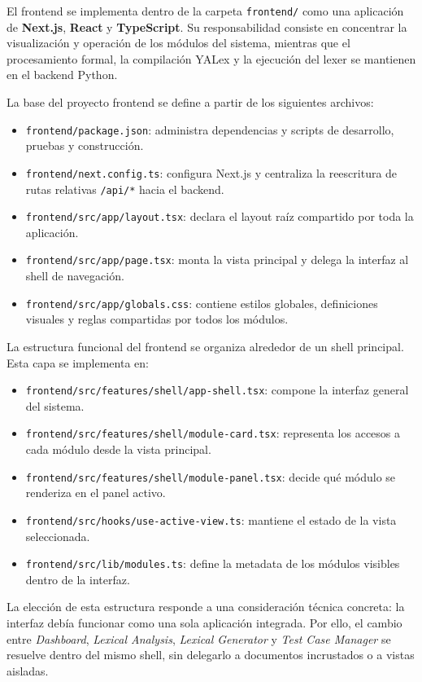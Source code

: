 \documentclass[12pt,a4paper]{article}
\begin{document}
El frontend se implementa dentro de la carpeta \texttt{frontend/} como una aplicación de \textbf{Next.js}, \textbf{React} y \textbf{TypeScript}. Su responsabilidad consiste en concentrar la visualización y operación de los módulos del sistema, mientras que el procesamiento formal, la compilación YALex y la ejecución del lexer se mantienen en el backend Python.

La base del proyecto frontend se define a partir de los siguientes archivos:

\begin{itemize}[leftmargin=2em]
  \item \texttt{frontend/package.json}: administra dependencias y scripts de desarrollo, pruebas y construcción.
  \item \texttt{frontend/next.config.ts}: configura Next.js y centraliza la reescritura de rutas relativas \texttt{/api/*} hacia el backend.
  \item \texttt{frontend/src/app/layout.tsx}: declara el layout raíz compartido por toda la aplicación.
  \item \texttt{frontend/src/app/page.tsx}: monta la vista principal y delega la interfaz al shell de navegación.
  \item \texttt{frontend/src/app/globals.css}: contiene estilos globales, definiciones visuales y reglas compartidas por todos los módulos.
\end{itemize}

La estructura funcional del frontend se organiza alrededor de un shell principal. Esta capa se implementa en:

\begin{itemize}[leftmargin=2em]
  \item \texttt{frontend/src/features/shell/app-shell.tsx}: compone la interfaz general del sistema.
  \item \texttt{frontend/src/features/shell/module-card.tsx}: representa los accesos a cada módulo desde la vista principal.
  \item \texttt{frontend/src/features/shell/module-panel.tsx}: decide qué módulo se renderiza en el panel activo.
  \item \texttt{frontend/src/hooks/use-active-view.ts}: mantiene el estado de la vista seleccionada.
  \item \texttt{frontend/src/lib/modules.ts}: define la metadata de los módulos visibles dentro de la interfaz.
\end{itemize}

La elección de esta estructura responde a una consideración técnica concreta: la interfaz debía funcionar como una sola aplicación integrada. Por ello, el cambio entre \emph{Dashboard}, \emph{Lexical Analysis}, \emph{Lexical Generator} y \emph{Test Case Manager} se resuelve dentro del mismo shell, sin delegarlo a documentos incrustados o a vistas aisladas.
\end{document}
